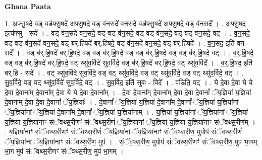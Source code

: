 \documentclass[17pt]{extarticle}
\begin{document}
\textbf{Ghana Paata } \newline

1. अ॒फ्सु॒षदे॒ वड् वड॑फ्सु॒षदे॑ अफ्सु॒षदे॒ वड् व॑न॒सदे॑ वन॒सदे॒ वड॑फ्सु॒षदे॑ अफ्सु॒षदे॒ वड् व॑न॒सदे᳚ । . अ॒फ्सु॒षद॒ इत्य॑फ्सु - सदे᳚ । . वड् व॑न॒सदे॑ वन॒सदे॒ वड् वड् व॑न॒सदे॒ वड् वड् व॑न॒सदे॒ वड् वड् व॑न॒सदे॒ वट् । . व॒न॒सदे॒ वड् वड् व॑न॒सदे॑ वन॒सदे॒ वड् ब॑र्.हि॒षदे॑ बर्.हि॒षदे॒ वड् व॑न॒सदे॑ वन॒सदे॒ वड् ब॑र्.हि॒षदे᳚ । . व॒न॒सद॒ इति॑ वन - सदे᳚ । . वड् ब॑र्.हि॒षदे॑ बर्.हि॒षदे॒ वड् वड् ब॑र्.हि॒षदे॒ वड् वड् ब॑र्.हि॒षदे॒ वड् वड् ब॑र्.हि॒षदे॒ वट् । . ब॒र्॒.हि॒षदे॒ वड् वड् ब॑र्.हि॒षदे॑ बर्.हि॒षदे॒ वट् थ्सु॑व॒र्विदे॑ सुव॒र्विदे॒ वड् ब॑र्.हि॒षदे॑ बर्.हि॒षदे॒ वट् थ्सु॑व॒र्विदे᳚ । . ब॒र्॒.हि॒षद॒ इति॑ बर्.हि - सदे᳚ । . वट् थ्सु॑व॒र्विदे॑ सुव॒र्विदे॒ वड् वट् थ्सु॑व॒र्विदे॒ वड् वट् थ्सु॑व॒र्विदे॒ वड् वट् थ्सु॑व॒र्विदे॒ वट् । . सु॒व॒र्विदे॒ वड् वट् थ्सु॑व॒र्विदे॑ सुव॒र्विदे॒ वट् । . सु॒व॒र्विद॒ इति॑ सुवः - विदे᳚ । . वडिति॒ वट् । . ये दे॒वा दे॒वा ये ये दे॒वा दे॒वाना᳚म् दे॒वाना᳚म् दे॒वा ये ये दे॒वा दे॒वाना᳚म् । . दे॒वा दे॒वाना᳚म् दे॒वाना᳚म् दे॒वा दे॒वा दे॒वानां᳚ ॅय॒ज्ञिया॑ य॒ज्ञिया॑ दे॒वाना᳚म् दे॒वा दे॒वा दे॒वानां᳚ ॅय॒ज्ञियाः᳚ । . दे॒वानां᳚ ॅय॒ज्ञिया॑ य॒ज्ञिया॑ दे॒वाना᳚म् दे॒वानां᳚ ॅय॒ज्ञिया॑ य॒ज्ञिया॑नां ॅय॒ज्ञिया॑नां ॅय॒ज्ञिया॑ दे॒वाना᳚म् दे॒वानां᳚ ॅय॒ज्ञिया॑ य॒ज्ञिया॑नाम् । . य॒ज्ञिया॑ य॒ज्ञिया॑नां ॅय॒ज्ञिया॑नां ॅय॒ज्ञिया॑ य॒ज्ञिया॑ य॒ज्ञिया॑नाꣳ संॅवथ्स॒रीणꣳ॑ संॅवथ्स॒रीणं॑ ॅय॒ज्ञिया॑नां ॅय॒ज्ञिया॑ य॒ज्ञिया॑ य॒ज्ञिया॑नाꣳ संॅवथ्स॒रीण᳚म् । . य॒ज्ञिया॑नाꣳ संॅवथ्स॒रीणꣳ॑ संॅवथ्स॒रीणं॑ ॅय॒ज्ञिया॑नां ॅय॒ज्ञिया॑नाꣳ संॅवथ्स॒रीण॒ मुपोप॑ संॅवथ्स॒रीणं॑ ॅय॒ज्ञिया॑नां ॅय॒ज्ञिया॑नाꣳ संॅवथ्स॒रीण॒ मुप॑ । . सं॒ॅव॒थ्स॒रीण॒ मुपोप॑ संॅवथ्स॒रीणꣳ॑ संॅवथ्स॒रीण॒ मुप॑ भा॒गम् भा॒ग मुप॑ संॅवथ्स॒रीणꣳ॑ संॅवथ्स॒रीण॒ मुप॑ भा॒गम् । \newline
\end{document}
